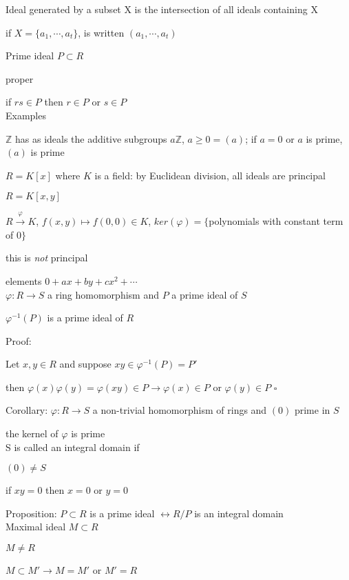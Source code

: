 \documentclass[12pt]{article}
\begin{document}
\noindent
Ideal generated by a subset X is the intersection of all ideals containing X

if $X = \{a_1, \cdots, a_t\}$, is written $(a_1, \cdots, a_t)$

\noindent
Prime ideal $P \subset R$

proper

if $rs \in P$ then $r \in P$ or $s \in P$\\

\noindent
Examples

\noindent
$\mathds{Z}$ has as ideals the additive subgroups $a\mathds{Z}$, $a \geq 0 = (a)$; if $a=0$ or $a$ is prime, $(a)$ is prime

\noindent
$R = K[x]$ where $K$ is a field: by Euclidean division, all ideals are principal

\noindent
$R = K[x, y]$

$R \xrightarrow{\varphi} K$, $f(x, y) \mapsto f(0, 0) \in K$, $ker(\varphi) = \{$polynomials with constant term of 0$\}$

this is \textit{not} principal

elements $0 + ax + by + cx^2 + \cdots$\\

\noindent
$\varphi: R \to S$ a ring homomorphism and $P$ a prime ideal of $S$

$\varphi^{-1}(P)$ is a prime ideal of $R$

\noindent
Proof:

Let $x, y \in R$ and suppose $xy \in \varphi^{-1}(P) = P'$

then $\varphi(x)\varphi(y) = \varphi(xy) \in P \to \varphi(x) \in P$ or $\varphi(y) \in P$ $\square$

\noindent
Corollary: $\varphi: R \to S$ a non-trivial homomorphism of rings and $(0)$ prime in $S$

the kernel of $\varphi$ is prime\\

\noindent
S is called an integral domain if 

$(0) \neq S$

if $xy = 0$ then $x = 0$ or $y = 0$

\noindent
Proposition: $P \subset R$ is a prime ideal $\leftrightarrow R/P$ is an integral domain\\

\noindent
Maximal ideal $M \subset R$

$M \neq R$

$M \subset M' \to M = M'$ or $M' = R$
\end{document}
